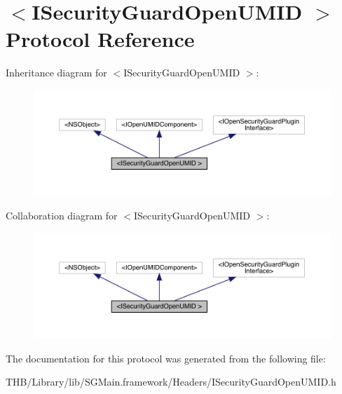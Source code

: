 \hypertarget{protocol_i_security_guard_open_u_m_i_d_01-p}{}\section{$<$I\+Security\+Guard\+Open\+U\+M\+ID $>$ Protocol Reference}
\label{protocol_i_security_guard_open_u_m_i_d_01-p}


Inheritance diagram for $<$I\+Security\+Guard\+Open\+U\+M\+ID $>$\+:\nopagebreak
\begin{figure}[H]
\begin{center}
\leavevmode
\includegraphics[width=350pt]{protocol_i_security_guard_open_u_m_i_d_01-p__inherit__graph}
\end{center}
\end{figure}


Collaboration diagram for $<$I\+Security\+Guard\+Open\+U\+M\+ID $>$\+:\nopagebreak
\begin{figure}[H]
\begin{center}
\leavevmode
\includegraphics[width=350pt]{protocol_i_security_guard_open_u_m_i_d_01-p__coll__graph}
\end{center}
\end{figure}


The documentation for this protocol was generated from the following file\+:\begin{DoxyCompactItemize}
\item 
T\+H\+B/\+Library/lib/\+S\+G\+Main.\+framework/\+Headers/I\+Security\+Guard\+Open\+U\+M\+I\+D.\+h\end{DoxyCompactItemize}
